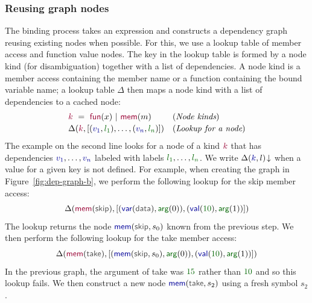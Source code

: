 \documentclass[acmsmall,anonymous,fleqn]{acmart}\settopmatter{printfolios=false,printccs=false,printacmref=false}
\theoremstyle{plain}
\theoremstyle{definition}
\newcommand{\num}[1]{\textcolor{numclr}{#1}}
\newcommand{\ident}[1]{\textnormal{\textcolor{idclr}{\sffamily #1}}}
\newcommand{\bndclr}[1]{\textcolor{kvdclr}{#1}}
\newcommand{\bkndclr}[1]{\textcolor{prepclr}{#1}}
\newcommand{\blblclr}[1]{\textcolor{numclr}{#1}}
\newcommand{\bnd}[1]{\textnormal{\textcolor{kvdclr}{\sffamily #1}}}
\newcommand{\bknd}[1]{\textnormal{\textcolor{prepclr}{\sffamily #1}}}
\newcommand{\blbl}[1]{\textnormal{\textcolor{numclr}{\sffamily #1}}}
\begin{document}

\subsubsection{Reusing graph nodes}
The binding process takes an expression and constructs a dependency graph reusing existing nodes
when possible. For this, we use a lookup table of member access and function value nodes. The key
in the lookup table is formed by a node kind (for disambiguation) together with a list of
dependencies. A node kind is a member access containing the member name or a function containing
the bound variable name; a lookup table $\Delta$ then maps a node kind with a list of dependencies
to a cached node:
%
\begin{equation*}
\begin{array}{ll}
\bkndclr{k}~=~\bknd{fun}(x)~|~\bknd{mem}(m)&(\textit{Node kinds})\\[0.2em]
\Delta(\bkndclr{k}, [(\bndclr{v_1},\blblclr{l_1}), \ldots, (\bndclr{v_n},\blblclr{l_n})])  & (\textit{Lookup for a node})
\end{array}
\end{equation*}
%
The example on the second line looks for a node of a kind $\bkndclr{k}$ that has dependencies
$\bndclr{v_1}, \ldots, \bndclr{v_n}$ labeled with labels $\blblclr{l_1}, \ldots, \blblclr{l_n}$.
We write $\Delta(\bndclr{k}, l)\!\downarrow$ when a value for a given key is not defined.
For example, when creating the graph in Figure~\ref{fig:dep-graph-b},
we perform the following lookup for the \ident{skip} member access:
%
\[ \Delta(\bknd{mem}(\ident{skip}), [(\bnd{var}(\ident{data}),\blbl{arg}(0)), (\bnd{val}(\num{10}), \blbl{arg}(1))]) \]
%
The lookup returns the node $\bnd{mem}(\ident{skip}, s_0)$ known from the previous step. We then perform
the following lookup for the \ident{take} member access:
%
\[ \Delta(\bknd{mem}(\ident{take}), [(\bnd{mem}(\ident{skip}, s_0),\blbl{arg}(0)), (\bnd{val}(\num{10}), \blbl{arg}(1))]) \]
%
In the previous graph, the argument of \ident{take} was $\num{15}$ rather than $\num{10}$ and so
this lookup fails. We then construct a new node $\bnd{mem}(\ident{take}, s_2)$ using a fresh
symbol $s_2$.

\end{document}
